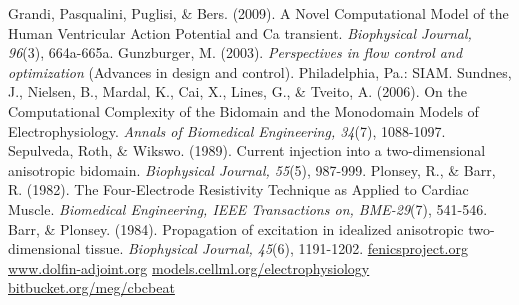 \documentclass[12pt,a4paper]{article}
\begin{document}
\begin{thebibliography}{99}
 Grandi, Pasqualini, Puglisi, \& Bers. (2009). A Novel Computational Model of the Human Ventricular Action Potential and Ca transient. \textit{Biophysical Journal, 96}(3), 664a-665a.
 Gunzburger, M. (2003). \textit{Perspectives in flow control and optimization} (Advances in design and control). Philadelphia, Pa.: SIAM.
 Sundnes, J., Nielsen, B., Mardal, K., Cai, X., Lines, G., \& Tveito, A. (2006). On the Computational Complexity of the Bidomain and the Monodomain Models of Electrophysiology. \textit{Annals of Biomedical Engineering, 34}(7), 1088-1097.
 Sepulveda, Roth, \& Wikswo. (1989). Current injection into a two-dimensional anisotropic bidomain. \textit{Biophysical Journal, 55}(5), 987-999.
 Plonsey, R., \& Barr, R. (1982). The Four-Electrode Resistivity Technique as Applied to Cardiac Muscle. \textit{Biomedical Engineering, IEEE Transactions on, BME-29}(7), 541-546.
 Barr, \& Plonsey. (1984). Propagation of excitation in idealized anisotropic two-dimensional tissue. \textit{Biophysical Journal, 45}(6), 1191-1202.
 \url{fenicsproject.org}
 \url{www.dolfin-adjoint.org}
 \url{models.cellml.org/electrophysiology}
 \url{bitbucket.org/meg/cbcbeat}
\end{thebibliography}
\end{document}
